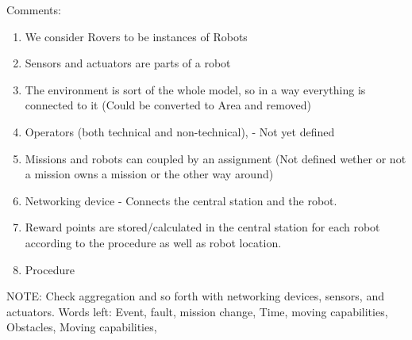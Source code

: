Comments: \begin{enumerate}
    \item We consider Rovers to be instances of Robots
    \item Sensors and actuators are parts of a robot
    \item The environment is sort of the whole model, so in a way everything is connected to it (Could be converted to Area and removed)
    \item Operators (both technical and non-technical), - Not yet defined 
    \item Missions and robots can coupled by an assignment (Not defined wether or not a mission owns a mission or the other way around)
    \item Networking device - Connects the central station and the robot.
    \item Reward points are stored/calculated in the central station for each robot according to the procedure as well as robot location.
    \item Procedure 
\end{enumerate} 

NOTE: Check aggregation and so forth with networking devices, sensors, and actuators.
Words left: Event, fault, mission change, Time, moving capabilities, Obstacles, Moving capabilities,

